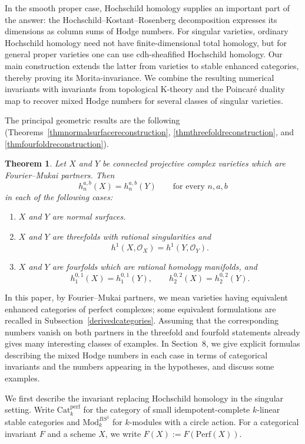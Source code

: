 \documentclass{amsart}
\theoremstyle{plain}
\newtheorem{theorem}[prop]{Theorem}
\theoremstyle{definition}
\newcommand{\Catperf}{\mathrm{Cat}^{\mathrm{perf}}}
\newcommand{\Perf}{\mathrm{Perf}}
\newcommand{\K}{\mathrm{K}}
\newcommand{\Mod}{\mathrm{Mod}}
\begin{document}
In the smooth proper case, Hochschild homology supplies an important part of the answer: the Hochschild--Kostant--Rosenberg decomposition expresses its dimensions as column sums of Hodge numbers. For singular varieties, ordinary Hochschild homology need not have finite-dimensional total homology, but for general proper varieties one can use cdh-sheafified Hochschild homology. Our main construction extends the latter from varieties to stable enhanced categories, thereby proving its Morita-invariance. We combine the resulting numerical invariants with invariants from topological $\K$-theory and the Poincar\'e duality map to recover mixed Hodge numbers for several classes of singular varieties.

The principal geometric results are the following
(Theorems~\ref{thmnormalsurfacereconstruction},
\ref{thmthreefoldreconstruction}, and
\ref{thmfourfoldreconstruction}).

\begin{theorem}\label{thmintroHodgeinvariance}
Let $X$ and $Y$ be connected projective complex varieties which are Fourier--Mukai partners. Then
\[
h_n^{a,b}(X)=h_n^{a,b}(Y)
\qquad\text{for every }n,a,b
\]
in each of the following cases:
\begin{enumerate}
\item
$X$ and $Y$ are normal surfaces.

\item
$X$ and $Y$ are threefolds with rational singularities and
\[
h^1(X,\mathcal O_X)=h^1(Y,\mathcal O_Y).
\]

\item
$X$ and $Y$ are fourfolds which are rational homology manifolds, and
\[
h^{0,1}_1(X)=h^{0,1}_1(Y),
\qquad
h^{0,2}_2(X)=h^{0,2}_2(Y).
\]
\end{enumerate}
\end{theorem}


In this paper, by Fourier--Mukai partners, we mean  varieties having equivalent enhanced categories of perfect complexes; some equivalent formulations are recalled in Subsection~\ref{derivedcategories}.
Assuming that the corresponding numbers vanish on both partners in the threefold and fourfold statements already gives many interesting classes of examples. In Section~8, we give explicit formulas describing the mixed Hodge numbers in each case in terms of categorical invariants and the numbers appearing in the hypotheses, and discuss some examples.

\medskip

We first describe the invariant replacing Hochschild homology in the singular setting. Write $\Catperf_k$ for the category of small idempotent-complete $k$-linear stable categories and $\Mod_k^{BS^1}$ for $k$-modules with a circle action. For a categorical invariant $F$ and a scheme $X$, we write $F(X):=F(\Perf(X))$.
\end{document}
